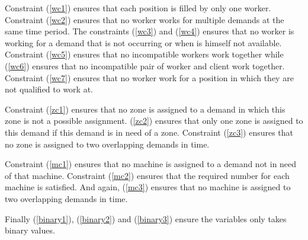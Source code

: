 \documentclass[../thesis.tex]{subfiles}
\begin{document}
Constraint (\ref{wc1}) ensures that each position is filled by only one worker. Constraint (\ref{wc2}) ensures that no worker works for multiple demands at the same time period. The constraints (\ref{wc3}) and (\ref{wc4}) ensures that no worker is working for a demand that is not occurring or when is himself not available. Constraint (\ref{wc5}) ensures that no incompatible workers work together while (\ref{wc6}) ensures that no incompatible pair of worker and client work together. Constraint (\ref{wc7}) ensures that no worker work for a position in which they are not qualified to work at.

Constraint (\ref{zc1}) ensures that no zone is assigned to a demand in which this zone is not a possible assignment. (\ref{zc2}) ensures that only one zone is assigned to this demand if this demand is in need of a zone. Constraint (\ref{zc3}) ensures that no zone is assigned to two overlapping demands in time.

Constraint (\ref{mc1}) ensures that no machine is assigned to a demand not in need of that machine. Constraint (\ref{mc2}) ensures that the required number for each machine is satisfied. And again, (\ref{mc3}) ensures that no machine is assigned to two overlapping demands in time.


Finally (\ref{binary1}), (\ref{binary2}) and (\ref{binary3}) ensure the variables only takes binary values.
\end{document}
